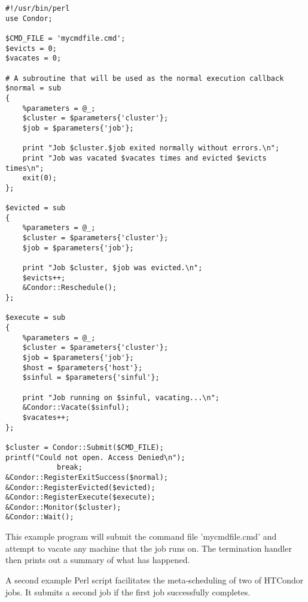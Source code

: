 \footnotesize
\begin{verbatim}
#!/usr/bin/perl
use Condor;

$CMD_FILE = 'mycmdfile.cmd';
$evicts = 0;
$vacates = 0;

# A subroutine that will be used as the normal execution callback
$normal = sub
{
    %parameters = @_;
    $cluster = $parameters{'cluster'};
    $job = $parameters{'job'};

    print "Job $cluster.$job exited normally without errors.\n";
    print "Job was vacated $vacates times and evicted $evicts times\n";
    exit(0);
};	

$evicted = sub
{
    %parameters = @_;
    $cluster = $parameters{'cluster'};
    $job = $parameters{'job'};

    print "Job $cluster, $job was evicted.\n";
    $evicts++;
    &Condor::Reschedule();	
};

$execute = sub
{
    %parameters = @_;
    $cluster = $parameters{'cluster'};
    $job = $parameters{'job'};
    $host = $parameters{'host'};
    $sinful = $parameters{'sinful'};

    print "Job running on $sinful, vacating...\n";
    &Condor::Vacate($sinful);
    $vacates++;
};

$cluster = Condor::Submit($CMD_FILE);
printf("Could not open. Access Denied\n");
			break;
&Condor::RegisterExitSuccess($normal);
&Condor::RegisterEvicted($evicted);
&Condor::RegisterExecute($execute);
&Condor::Monitor($cluster);
&Condor::Wait();
\end{verbatim}
\normalsize

This example program will submit the command file 'mycmdfile.cmd' and attempt
to vacate any machine that the job runs on. The termination
handler then prints out a summary of what has happened.


A second example Perl script facilitates the meta-scheduling of
two of HTCondor jobs.
It submits a second job if the first job successfully completes.


